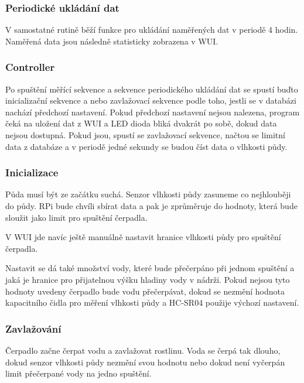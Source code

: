 \documentclass[12pt,a4paper]{article}
\begin{document}

\subsubsection{Periodické ukládání dat}

V samostatné rutině běží funkce pro ukládání naměřených dat v periodě 4 hodin. Naměřená data jsou následně statisticky zobrazena v \ac{WUI}.

\subsubsection{Controller}

Po spuštění měřící sekvence a sekvence periodického ukládání dat se spustí buďto inicializační sekvence a nebo zavlažovací sekvence podle toho, jestli se v databázi nachází předchozí nastavení. Pokud předchozí nastavení nejsou nalezena, program čeká na uložení dat z \ac{WUI} a \ac{LED} dioda bliká dvakrát po sobě, dokud data nejsou dostupná. Pokud jsou, spustí se zavlažovací sekvence, načtou se limitní data z databáze a v periodě jedné sekundy se budou číst data o vlhkosti půdy.

\subsubsection{Inicializace}

Půda musí být ze začátku suchá. Senzor vlhkosti půdy zasuneme co nejhlouběji do půdy. \ac{RPi} bude chvíli sbírat data a pak je zprůměruje do hodnoty, která bude sloužit jako limit pro spuštění čerpadla.

V \ac{WUI} jde navíc ještě manuálně nastavit hranice vlhkosti půdy pro spuštění
čerpadla.

Nastavit se dá také množství vody, které bude přečerpáno při jednom spuštění a jaká je hranice pro přijatelnou výšku hladiny vody v nádrži. Pokud nejsou tyto hodnoty uvedeny čerpadlo bude vodu přečerpávat, dokud se nezmění hodnota kapacitního čidla pro měření vlhkosti půdy a \ac{HC-SR04} použije výchozí nastavení.

\subsubsection{Zavlažování}

Čerpadlo začne čerpat vodu a zavlažovat rostlinu. Voda se čerpá tak dlouho, dokud senzor vlhkosti půdy nezmění svou hodnotu nebo dokud není vyčerpán limit přečerpané vody na jedno spuštění.
\end{document}
